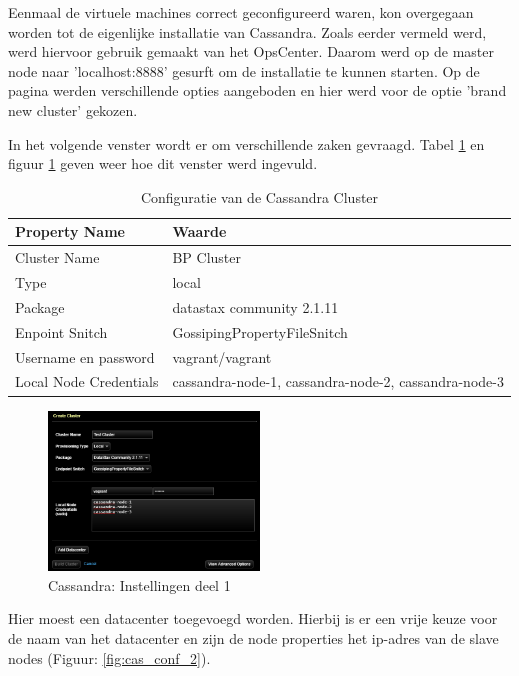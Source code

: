 Eenmaal de virtuele machines correct geconfigureerd waren, kon overgegaan worden tot de eigenlijke installatie van Cassandra.
Zoals eerder vermeld werd, werd hiervoor gebruik gemaakt van het OpsCenter.
Daarom werd op de master node naar 'localhost:8888' gesurft om de installatie te kunnen  starten.
Op de pagina werden verschillende opties aangeboden en hier werd voor de optie 'brand new cluster' gekozen.

In het volgende venster wordt er om verschillende zaken gevraagd.
Tabel \ref{tab:cas_conf} en figuur \ref{fig:cas_conf_1} geven weer hoe dit venster werd ingevuld.

\begin{table}[H]
  \begin{tabular}{|l|l|}
  \hline
  Property Name & Waarde \\
  \hline
  \hline
  Cluster Name & BP Cluster \\
  \hline
  Type & local \\
  \hline
  Package & datastax community 2.1.11 \\
  \hline
  Enpoint Snitch & GossipingPropertyFileSnitch \\
  \hline
  Username en password & vagrant/vagrant\\
  \hline
  Local Node Credentials & cassandra-node-1, cassandra-node-2, cassandra-node-3 \\
  \hline
  \end{tabular}
  \caption{Configuratie van de Cassandra Cluster}
  \label{tab:cas_conf}
\end{table}

\begin{figure}[H]
  	\centering
    \includegraphics[width=0.5\textwidth]{img/4_installatie_cassandra/1_Configuration_part_1}
    \caption{Cassandra: Instellingen deel 1}
    \label{fig:cas_conf_1}
\end{figure}

Hier moest een datacenter toegevoegd worden.
Hierbij is er een vrije keuze voor de naam van het datacenter en zijn de node properties het ip-adres van de slave nodes (Figuur: \ref{fig:cas_conf_2}).

